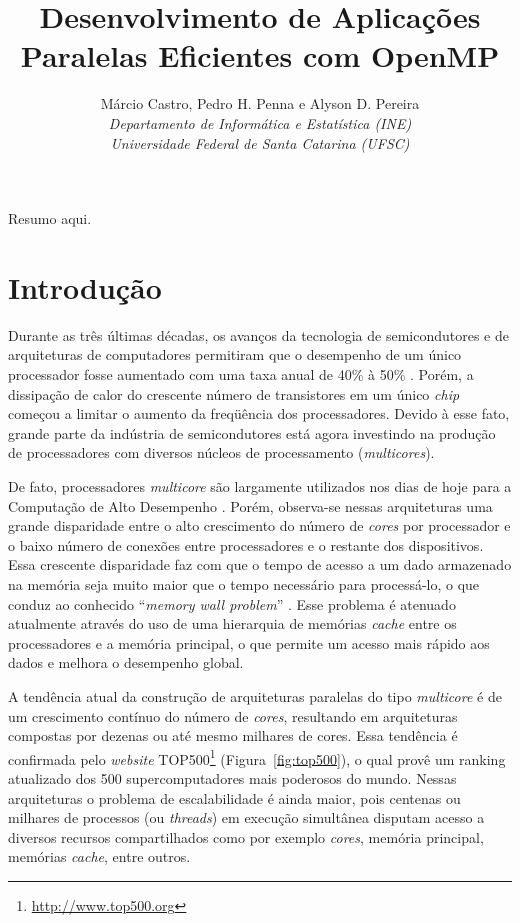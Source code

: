 \documentclass{SBCbookchapter}
\author{Márcio Castro, Pedro H. Penna e Alyson D. Pereira\\
\textit{Departamento de Informática e Estatística (INE)}\\
\textit{Universidade Federal de Santa Catarina (UFSC)}
}
\title{Desenvolvimento de Aplicações Paralelas Eficientes com OpenMP}
\begin{document}
\maketitle

\begin{resumo}
Resumo aqui.
\end{resumo}

\section{Introdução}

Durante as três últimas décadas, os avanços da tecnologia de semicondutores e de arquiteturas de computadores permitiram que o desempenho de um único processador fosse aumentado com uma taxa anual de 40\% à 50\% \cite{LARUS08}. Porém, a dissipação de calor do crescente número de transistores em um único \emph{chip} começou a limitar o aumento da freqüência dos processadores. Devido à esse fato, grande parte da indústria de semicondutores está agora investindo na produção de processadores com diversos núcleos de processamento (\emph{multicores}).

De fato, processadores \emph{multicore} são largamente utilizados nos dias de hoje para a Computação de Alto Desempenho \cite{Asanovic09}. Porém, observa-se nessas arquiteturas uma grande disparidade entre o alto crescimento do número de \emph{cores} por processador e o baixo número de conexões entre processadores e o restante dos dispositivos. Essa crescente disparidade faz com que o tempo de acesso a um dado armazenado na memória seja muito maior que o tempo necessário para processá-lo, o que conduz ao conhecido ``\emph{memory wall problem}'' \cite{McKee-MemWall:2004}. Esse problema é atenuado atualmente através do uso de uma hierarquia de memórias \emph{cache} entre os processadores e a memória principal, o que permite um acesso mais rápido aos dados e melhora o desempenho global.

A tendência atual da construção de arquiteturas paralelas do tipo \emph{multicore} é de um crescimento contínuo do número de \emph{cores}, resultando em arquiteturas compostas por dezenas ou até mesmo milhares de cores. Essa tendência é confirmada pelo \emph{website} TOP500\footnote{\url{http://www.top500.org}} (Figura~\ref{fig:top500}), o qual provê um ranking atualizado dos 500 supercomputadores mais poderosos do mundo. Nessas arquiteturas o problema de escalabilidade é ainda maior, pois centenas ou milhares de processos (ou \emph{threads}) em execução simultânea disputam acesso a diversos recursos compartilhados como por exemplo \emph{cores}, memória principal, memórias \emph{cache}, entre outros.
\end{document}
